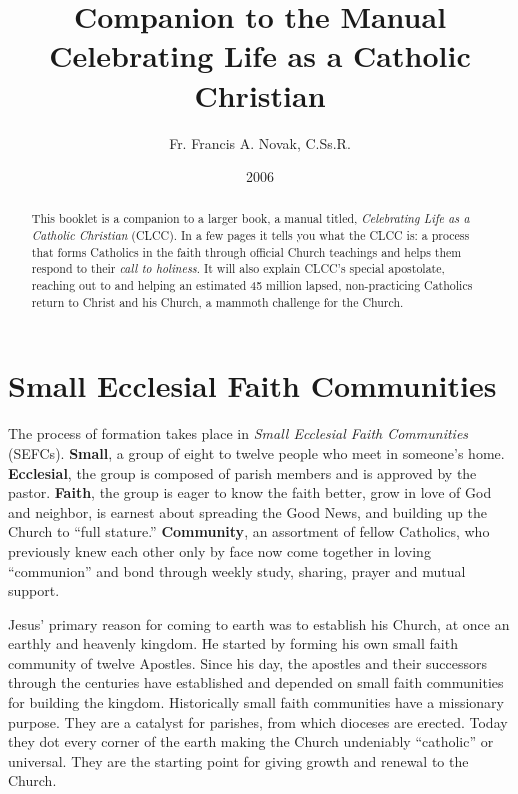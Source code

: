 \documentclass{article}
\title{\textbf{Companion to the Manual} \\
               Celebrating Life as a Catholic Christian}
\author{Fr. Francis A. Novak, C.Ss.R.}
\date{2006}
\begin{document}

\maketitle

\renewcommand{\abstractname}{Veni, Sancte Spiritus!}
\begin{abstract}

This booklet is a companion to a larger book, a manual titled, \emph{Celebrating
Life as a Catholic Christian} (CLCC). In a few pages it tells you what the CLCC
is: a process that forms Catholics in the faith through official Church
teachings and helps them respond to their \emph{call to holiness}. It will also
explain CLCC's special apostolate, reaching out to and helping an estimated 45
million lapsed, non-practicing Catholics return to Christ and his Church, a
mammoth challenge for the Church.

\end{abstract}


\setcounter{secnumdepth}{0}
\section{Small Ecclesial Faith Communities}

The process of formation takes place in \emph{Small Ecclesial Faith Communities}
(SEFCs). \textbf{Small}, a group of eight to twelve people who meet in someone's
home. \textbf{Ecclesial}, the group is composed of parish members and is
approved by the pastor. \textbf{Faith}, the group is eager to know the faith
better, grow in love of God and neighbor, is earnest about spreading the Good
News, and building up the Church to ``full stature.'' \textbf{Community}, an
assortment of fellow Catholics, who previously knew each other only by face now
come together in loving ``communion'' and bond through weekly study, sharing,
prayer and mutual support.

Jesus' primary reason for coming to earth was to establish his Church, at once
an earthly and heavenly kingdom. He started by forming his own small faith
community of twelve Apostles. Since his day, the apostles and their successors
through the centuries have established and depended on small faith communities
for building the kingdom. Historically small faith communities have a missionary
purpose. They are a catalyst for parishes, from which dioceses are
erected. Today they dot every corner of the earth making the Church undeniably
``catholic'' or universal. They are the starting point for giving growth and
renewal to the Church.
\end{document}

